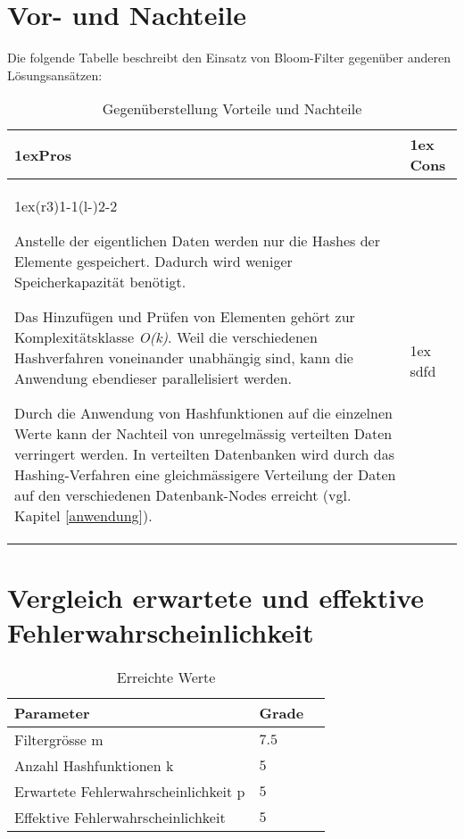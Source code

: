 \documentclass[10pt, a4paper, twocolumn]{article} %
\begin{document}
\section{Vor- und Nachteile}

Die folgende Tabelle beschreibt den Einsatz von Bloom-Filter gegenüber anderen Lösungsansätzen:

\begin{table}[h]
	\begin{tabularx}{\linewidth}{>{\parskip1ex}X@{\kern4\tabcolsep}>{\parskip1ex}X}
		\toprule
		\hfil\bfseries Pros
		&
		\hfil\bfseries Cons
		\\\cmidrule(r{3\tabcolsep}){1-1}\cmidrule(l{-\tabcolsep}){2-2}

		\lipsum[1] Anstelle der eigentlichen Daten werden nur die Hashes der Elemente gespeichert. Dadurch wird weniger Speicherkapazität benötigt.
		\par
		\lipsum[2] Das Hinzufügen und Prüfen von Elementen gehört zur Komplexitätsklasse \textit{O(k)}. Weil die verschiedenen Hashverfahren voneinander unabhängig sind, kann die Anwendung ebendieser parallelisiert werden.
		\par
		\lipsum[3] Durch die Anwendung von Hashfunktionen auf die einzelnen Werte kann der Nachteil von unregelmässig verteilten Daten verringert werden. In verteilten Datenbanken wird durch das Hashing-Verfahren eine gleichmässigere Verteilung der Daten auf den verschiedenen Datenbank-Nodes erreicht (vgl. Kapitel \ref{anwendung}).

		&
		\lipsum[1] sdfd%

		\\\bottomrule
	\end{tabularx}
	\caption{Gegenüberstellung Vorteile und Nachteile}
\end{table}

\section{Vergleich erwartete und effektive Fehlerwahrscheinlichkeit}

\begin{table}
	\caption{Erreichte Werte}
	\centering
	\begin{tabular}{llr}
		\toprule
		\cmidrule(r){1-2}
		Parameter & Grade \\
		\midrule
		Filtergrösse m & $7.5$ \\
		Anzahl Hashfunktionen k & $5$ \\
		Erwartete Fehlerwahrscheinlichkeit p & $5$ \\
		Effektive Fehlerwahrscheinlichkeit & $5$ \\
		\bottomrule
	\end{tabular}
\end{table}
\end{document}
